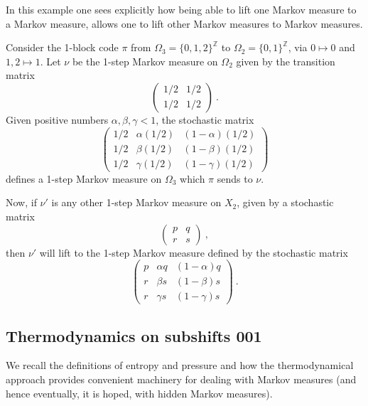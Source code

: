 \documentclass{kepart2010}
\theoremstyle{plain}
\theoremstyle{definition}
\theoremstyle{remark}
\theoremstyle{definition}
\numberwithin{equation}{section}
\begin{document}
\begin{ex}\label{exliftone}
In this example one sees explicitly how being able to lift one
Markov measure to a Markov measure, allows one to lift other Markov
measures to Markov measures.

Consider the 1-block code $\pi$ from $\Omega_3=\{0,1,2\}^{\mathbb
Z}$ to $\Omega_2=\{0,1\}^{\mathbb Z}$, via $0\mapsto 0$ and
$1,2\mapsto 1$. Let  $\nu$ be the  1-step Markov measure on
$\Omega_2$
 given by
the transition matrix
\begin{equation*}
\begin{pmatrix}
 1/2 &  1/2 \\
 1/2 & 1/2
\end{pmatrix} \ .
\end{equation*}
Given positive numbers $\alpha , \beta, \gamma <1 $, the stochastic
matrix \begin{equation}
\begin{pmatrix}
1/2 &\alpha (1/2) & (1-\alpha ) (1/2)   \\
1/2 &\beta (1/2) & (1-\beta ) (1/2)     \\
1/2 & \gamma (1/2) & (1-\gamma ) (1/2)
\end{pmatrix}
\end{equation} defines a 1-step Markov measure on $\Omega_3$ which
$\pi$ sends to $\nu$.

Now, if $\nu'$ is  any other 1-step Markov measure  on $X_2$, given
by a stochastic matrix
\begin{equation*}
\begin{pmatrix}
p & q \\
r & s
\end{pmatrix} \  ,
\end{equation*}
then $\nu'$ will lift to the 1-step Markov measure defined by the
stochastic matrix \begin{equation}
\begin{pmatrix} \label{resolvingsplit}
p &\alpha  q & (1-\alpha )  q   \\
r &\beta s & (1-\beta ) s  \\
r & \gamma s & (1-\gamma ) s
\end{pmatrix} \ .
\end{equation}
\end{ex}

\subsection{Thermodynamics on subshifts 001}\label{thermo}
We recall the definitions of entropy and pressure and how the
thermodynamical approach provides convenient machinery for dealing
with Markov measures (and hence eventually, it is hoped, with hidden
Markov measures).
\end{document}
